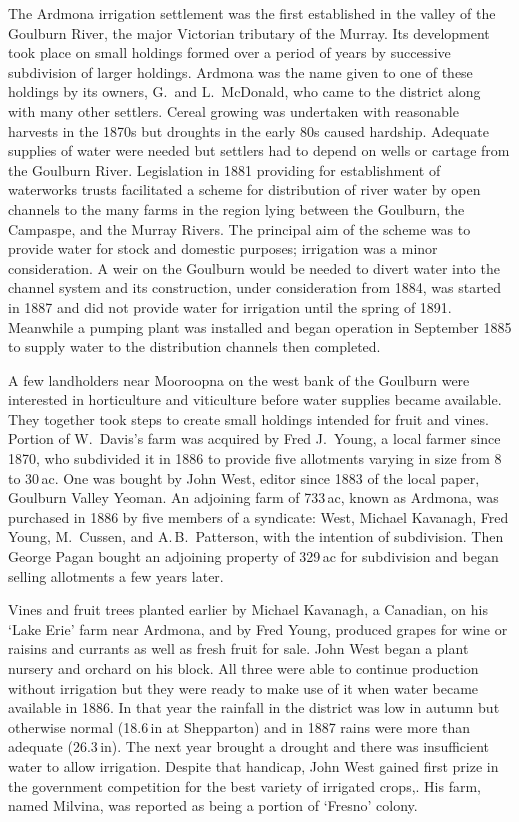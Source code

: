 The Ardmona irrigation settlement was the first established in the
valley of the Goulburn River, the major Victorian tributary of the
Murray.  Its development took place on small holdings formed over a
period of years by successive subdivision of larger holdings.  Ardmona
was the name given to one of these holdings by its owners, G.~and
L.~McDonald, who came to the district along with many other settlers.
Cereal growing was undertaken with reasonable harvests in the 1870s
but droughts in the early 80s caused hardship.  Adequate supplies of
water were needed but settlers had to depend on wells or cartage from
the Goulburn River.  Legislation in 1881 providing for establishment
of waterworks trusts facilitated a scheme for distribution of river
water by open channels to the many farms in the region lying between
the Goulburn, the Campaspe, and the Murray Rivers.  The principal aim
of the scheme was to provide water for stock and domestic purposes;
irrigation was a minor consideration.  A weir on the Goulburn would be
needed to divert water into the channel system and its construction,
under consideration from 1884, was started in 1887 and did not provide
water for irrigation until the spring of 1891. Meanwhile a pumping
plant was installed and began operation in September 1885 to supply
water to the distribution channels then
completed.

A few landholders near Mooroopna on the west bank of the Goulburn were
interested in horticulture and viticulture before water supplies
became available.  They together took steps to create small holdings
intended for fruit and vines.  Portion of W.~Davis's farm was acquired
by Fred J.~Young, a local farmer since 1870, who subdivided it in 1886
to provide five allotments varying in size from 8 to 30\,ac. One was
bought by John West, editor since 1883 of the local paper, Goulburn
Valley Yeoman.  An adjoining farm of 733\,ac, known as Ardmona, was
purchased in 1886 by five members of a syndicate: West, Michael
Kavanagh, Fred Young, M.~Cussen, and A.\,B.~Patterson, with the
intention of subdivision.  Then George Pagan bought an adjoining
property of 329\,ac for subdivision and began selling allotments a few
years later.

Vines and fruit trees planted earlier by Michael Kavanagh, a Canadian,
on his `Lake Erie' farm near Ardmona, and by Fred Young, produced
grapes for wine or raisins and currants as well as fresh fruit for
sale.  John West began a plant nursery and orchard on his block.  All
three were able to continue production without irrigation but they
were ready to make use of it when water became available in 1886.  In
that year the rainfall in the district was low in autumn but otherwise
normal (18.6\,in at Shepparton) and in 1887 rains were more than
adequate (26.3\,in).  The next year brought a drought and there was
insufficient water to allow irrigation.  Despite that handicap, John
West gained first prize in the government competition for the best
variety of irrigated crops,. His farm, named Milvina, was reported as
being a portion of `Fresno' colony.

